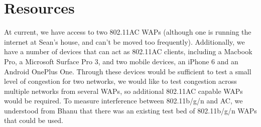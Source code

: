 \section{Resources}

At current, we have access to two 802.11AC WAPs (although one is running the
internet at Sean's house, and can't be moved too frequently). Additionally, we
have a number of devices that can act as 802.11AC clients, including a Macbook
Pro, a Microsoft Surface Pro 3, and two mobile devices, an iPhone 6 and an
Android OnePlus One. Through these devices would be sufficient to test
a small level of congestion for two networks, we would like to test congestion
across multiple networks from several WAPs, so additional 802.11AC capable WAPs
would be required. To measure interference between 802.11b/g/n and AC, we
understood from Bhanu that there was an existing test bed of 802.11b/g/n WAPs
that could be used.
